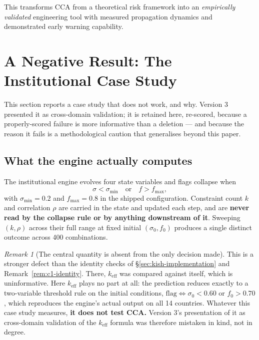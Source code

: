 \documentclass[11pt,a4paper]{article}
\theoremstyle{definition}
\theoremstyle{remark}
\newtheorem{remark}{Remark}[section]
\newcommand{\keff}{k_{\text{eff}}}
\begin{document}
This transforms CCA from a theoretical risk framework into an \textit{empirically validated} engineering tool with measured propagation dynamics and demonstrated early warning capability.

\section{A Negative Result: The Institutional Case Study}
\label{sec:institutional-negative}

This section reports a case study that does not work, and why. Version 3 presented it as
cross-domain validation; it is retained here, re-scored, because a properly-scored failure is
more informative than a deletion --- and because the reason it fails is a methodological
caution that generalises beyond this paper.

\subsection{What the engine actually computes}

The institutional engine evolves four state variables and flags collapse when
\[
\sigma < \sigma_{\min} \quad\text{or}\quad f > f_{\max},
\]
with $\sigma_{\min} = 0.2$ and $f_{\max} = 0.8$ in the shipped configuration. Constraint count
$k$ and correlation $\rho$ are carried in the state and updated each step, and are \textbf{never
read by the collapse rule or by anything downstream of it}. Sweeping $(k, \rho)$ across their
full range at fixed initial $(\sigma_0, f_0)$ produces a single distinct outcome across 400
combinations.

\begin{remark}[The central quantity is absent from the only decision made]
This is a stronger defect than the identity checks of \S\ref{sec:kish-implementation} and
Remark~\ref{rem:c1-identity}. There, $\keff$ was compared against itself, which is
uninformative. Here $\keff$ plays no part at all: the prediction reduces exactly to a
two-variable threshold rule on the initial conditions, $\text{flag} \iff \sigma_0 < 0.60$ or
$f_0 > 0.70$, which reproduces the engine's actual output on all 14 countries. Whatever this
case study measures, \textbf{it does not test CCA.} Version 3's presentation of it as
cross-domain validation of the $\keff$ formula was therefore mistaken in kind, not in degree.
\end{remark}
\end{document}
